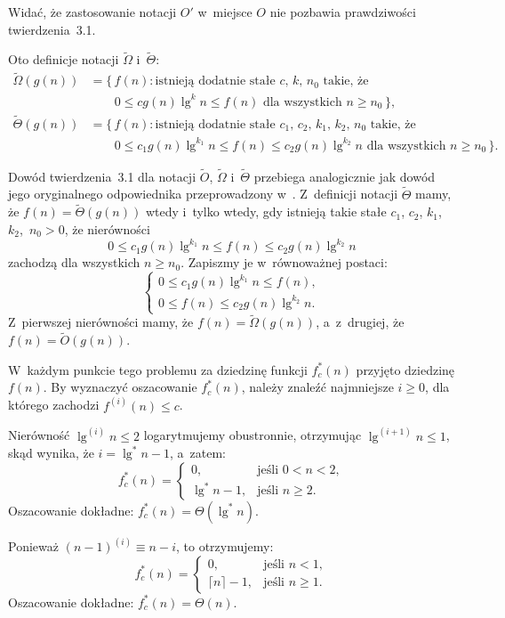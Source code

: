 Widać, że zastosowanie notacji $O'$ w~miejsce $O$ nie pozbawia prawdziwości twierdzenia~3.1.

\subproblem %
Oto definicje notacji $\widetilde{\Omega}$ i~$\widetilde{\Theta}$:
\[
	\begin{split}
		\widetilde{\Omega}(g(n)) &= \bigl\{\,f(n):\text{istnieją dodatnie stałe $c$,~$k$,~$n_0$ takie, że} \\
		&\qquad 0 \le cg(n)\lg^kn \le f(n) \text{ dla wszystkich $n \ge n_0$}\,\bigr\}, \\
		\widetilde{\Theta}(g(n)) &= \bigl\{\,f(n):\text{istnieją dodatnie stałe $c_1$,~$c_2$,~$k_1$,~$k_2$,~$n_0$ takie, że} \\
		&\qquad 0 \le c_1g(n)\lg^{k_1}n \le f(n) \le c_2g(n)\lg^{k_2}n \text{ dla wszystkich $n \ge n_0$}\,\bigr\}.
	\end{split}
\]

Dowód twierdzenia~3.1 dla notacji $\widetilde{O}$, $\widetilde{\Omega}$ i~$\widetilde{\Theta}$ przebiega analogicznie jak dowód jego oryginalnego odpowiednika przeprowadzony w~. Z~definicji notacji $\widetilde{\Theta}$ mamy, że $f(n)=\widetilde{\Theta}(g(n))$ wtedy i~tylko wtedy, gdy istnieją takie stałe $c_1$, $c_2$, $k_1$, $k_2$,~$n_0>0$, że nierówności
\[
	0 \le c_1g(n)\lg^{k_1}n \le f(n) \le c_2g(n)\lg^{k_2}n
\]
zachodzą dla wszystkich $n\ge n_0$. Zapiszmy je w~równoważnej postaci:
\[
	\begin{cases}
		0 \le c_1g(n)\lg^{k_1}n \le f(n), \\
		0 \le f(n) \le c_2g(n)\lg^{k_2}n.
	\end{cases}
\]
Z~pierwszej nierówności mamy, że $f(n)=\widetilde{\Omega}(g(n))$, a~z~drugiej, że $f(n)=\widetilde{O}(g(n))$.

W~każdym punkcie tego problemu za dziedzinę funkcji $f_c^*(n)$ przyjęto dziedzinę $f(n)$. By wyznaczyć oszacowanie $f_c^*(n)$, należy znaleźć najmniejsze $i\ge0$, dla którego zachodzi $f^{(i)}(n)\le c$.

\subproblem %
Nierówność $\lg^{(i)}n\le2$ logarytmujemy obustronnie, otrzymując $\lg^{(i+1)}n\le1$, skąd wynika, że $i=\lg^*n-1$, a~zatem:
\[
	f_c^*(n) =
	\begin{cases}
		0, & \text{jeśli $0<n<2$}, \\
		\lg^*n-1, & \text{jeśli $n\ge2$}.
	\end{cases}
\]
Oszacowanie dokładne: $f_c^*(n)=\Theta(\lg^*n)$.

\subproblem %
Ponieważ $(n-1)^{(i)}\equiv n-i$, to otrzymujemy:
\[
	f_c^*(n) =
	\begin{cases}
		0, & \text{jeśli $n<1$}, \\
		\lceil n\rceil-1, & \text{jeśli $n\ge1$}.
	\end{cases}
\]
Oszacowanie dokładne: $f_c^*(n)=\Theta(n)$.

